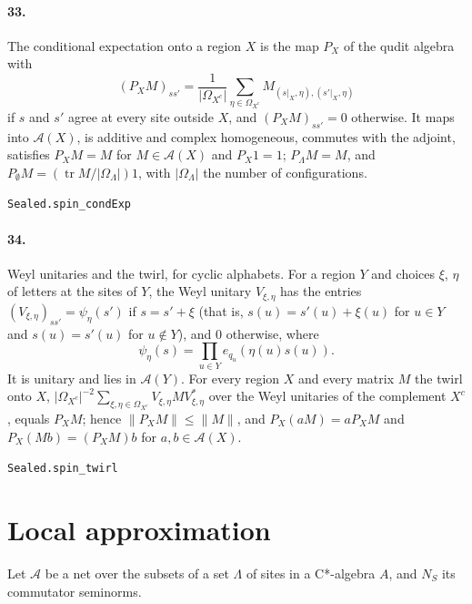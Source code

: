 \documentclass[11pt]{article}
\begin{document}
\paragraph{33.} The conditional expectation onto a region $X$ is the map $P_X$ of the qudit algebra with \[(P_X M)_{s s'} = \frac{1}{|\Omega_{X^c}|} \sum_{\eta \in \Omega_{X^c}} M_{(s|_X, \eta), (s'|_X, \eta)}\] if $s$ and $s'$ agree at every site outside $X$, and $(P_X M)_{s s'} = 0$ otherwise. It maps into $\mathcal A(X)$, is additive and complex homogeneous, commutes with the adjoint, satisfies $P_X M = M$ for $M \in \mathcal A(X)$ and $P_X 1 = 1$; $P_\Lambda M = M$, and $P_\emptyset M = (\operatorname{tr} M / |\Omega_\Lambda|) 1$, with $|\Omega_\Lambda|$ the number of configurations.\par{\footnotesize\texttt{Sealed.spin\_condExp}}

\paragraph{34.} Weyl unitaries and the twirl, for cyclic alphabets. For a region $Y$ and choices $\xi$, $\eta$ of letters at the sites of $Y$, the Weyl unitary $V_{\xi, \eta}$ has the entries $(V_{\xi, \eta})_{s s'} = \psi_\eta(s')$ if $s = s' + \xi$ (that is, $s(u) = s'(u) + \xi(u)$ for $u \in Y$ and $s(u) = s'(u)$ for $u \notin Y$), and $0$ otherwise, where \[\psi_\eta(s) = \prod_{u \in Y} e_{q_u}(\eta(u) s(u)).\] It is unitary and lies in $\mathcal A(Y)$. For every region $X$ and every matrix $M$ the twirl onto $X$, $|\Omega_{X^c}|^{-2} \sum_{\xi, \eta \in \Omega_{X^c}} V_{\xi, \eta} M V_{\xi, \eta}^*$ over the Weyl unitaries of the complement $X^c$, equals $P_X M$; hence $\|P_X M\| \le \|M\|$, and $P_X(a M) = a P_X M$ and $P_X(M b) = (P_X M) b$ for $a, b \in \mathcal A(X)$.\par{\footnotesize\texttt{Sealed.spin\_twirl}}

\section*{Local approximation}
Let $\mathcal A$ be a net over the subsets of a set $\Lambda$ of sites in a C*-algebra $A$, and $N_S$ its commutator seminorms.
\end{document}
